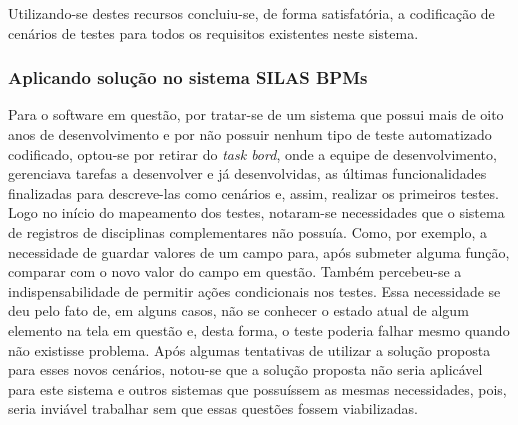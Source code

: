\documentclass[tg]{mdtufsm}
\begin{document}
Utilizando-se destes recursos concluiu-se, de forma satisfatória, a codificação de cenários de testes para todos os requisitos existentes neste sistema.

\subsubsection{Aplicando solução no sistema SILAS BPMs}
Para o software em questão, por tratar-se de um sistema que possui mais de oito anos de desenvolvimento e por não possuir nenhum tipo de teste automatizado codificado, optou-se por retirar do \emph{task bord}, onde a equipe de desenvolvimento, gerenciava tarefas a desenvolver e já desenvolvidas, as últimas funcionalidades finalizadas para descreve-las como cenários e, assim, realizar os primeiros testes.
Logo no início do mapeamento dos testes, notaram-se necessidades que o sistema de registros de disciplinas complementares não possuía. Como, por exemplo, a necessidade de guardar valores de um campo para, após submeter alguma função, comparar com o novo valor do campo em questão. Também percebeu-se a indispensabilidade de permitir ações condicionais nos testes. Essa necessidade se deu pelo fato de, em alguns casos, não se conhecer o estado atual de algum elemento na tela em questão e, desta forma, o teste poderia falhar mesmo quando não existisse problema.
Após algumas tentativas de utilizar a solução proposta para esses novos cenários, notou-se que a solução proposta não seria aplicável para este sistema e outros sistemas que possuíssem as mesmas necessidades, pois, seria inviável trabalhar sem que essas questões fossem viabilizadas.
\end{document}
